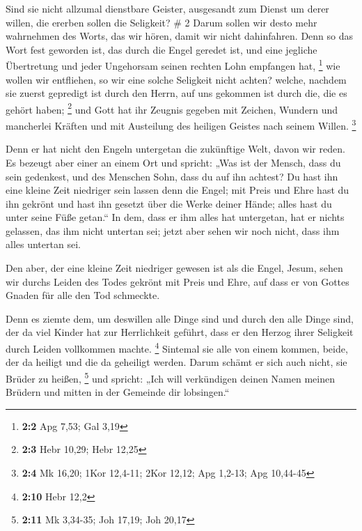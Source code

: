  Sind sie nicht allzumal dienstbare Geister, ausgesandt zum
Dienst um derer willen, die ererben sollen die Seligkeit? \# 2
 Darum sollen wir desto mehr wahrnehmen des Worts, das wir
hören, damit wir nicht dahinfahren.  Denn so das Wort fest
geworden ist, das durch die Engel geredet ist, und eine jegliche
Übertretung und jeder Ungehorsam seinen rechten Lohn empfangen hat,
\footnote{\textbf{2:2} Apg 7,53; Gal 3,19}  wie wollen wir
entfliehen, so wir eine solche Seligkeit nicht achten? welche, nachdem
sie zuerst gepredigt ist durch den Herrn, auf uns gekommen ist durch
die, die es gehört haben; \footnote{\textbf{2:3} Hebr 10,29; Hebr 12,25}
 und Gott hat ihr Zeugnis gegeben mit Zeichen, Wundern und
mancherlei Kräften und mit Austeilung des heiligen Geistes nach seinem
Willen. \footnote{\textbf{2:4} Mk 16,20; 1Kor 12,4-11; 2Kor 12,12; Apg
  1,2-13; Apg 10,44-45}

 Denn er hat nicht den Engeln untergetan die zukünftige
Welt, davon wir reden.  Es bezeugt aber einer an einem Ort
und spricht: „Was ist der Mensch, dass du sein gedenkest, und des
Menschen Sohn, dass du auf ihn achtest?  Du hast ihn eine
kleine Zeit niedriger sein lassen denn die Engel; mit Preis und Ehre
hast du ihn gekrönt und hast ihn gesetzt über die Werke deiner Hände;
 alles hast du unter seine Füße getan.`` In dem, dass er ihm
alles hat untergetan, hat er nichts gelassen, das ihm nicht untertan
sei; jetzt aber sehen wir noch nicht, dass ihm alles untertan sei.

 Den aber, der eine kleine Zeit niedriger gewesen ist als
die Engel, Jesum, sehen wir durchs Leiden des Todes gekrönt mit Preis
und Ehre, auf dass er von Gottes Gnaden für alle den Tod schmeckte.

 Denn es ziemte dem, um deswillen alle Dinge sind und durch
den alle Dinge sind, der da viel Kinder hat zur Herrlichkeit geführt,
dass er den Herzog ihrer Seligkeit durch Leiden vollkommen machte.
\footnote{\textbf{2:10} Hebr 12,2}  Sintemal sie alle von
einem kommen, beide, der da heiligt und die da geheiligt werden. Darum
schämt er sich auch nicht, sie Brüder zu heißen, \footnote{\textbf{2:11}
  Mk 3,34-35; Joh 17,19; Joh 20,17}  und spricht: „Ich will
verkündigen deinen Namen meinen Brüdern und mitten in der Gemeinde dir
lobsingen.``


